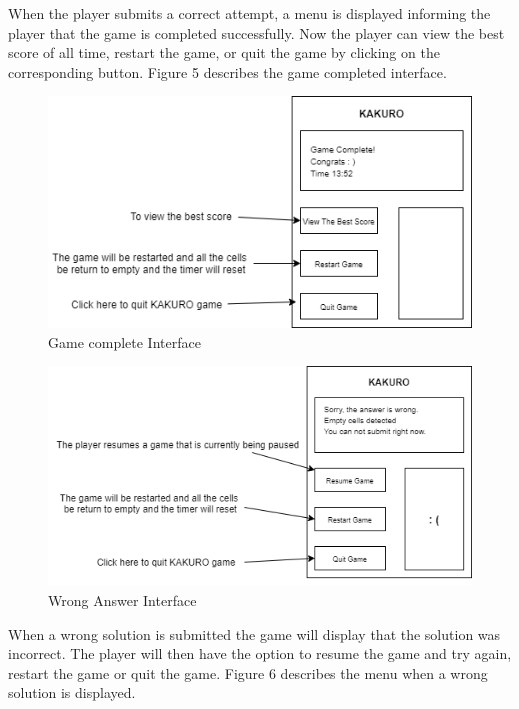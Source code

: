 \documentclass[12pt]{article}
\begin{document}
When the player submits a correct attempt, a menu is displayed informing the player that the game is completed successfully. Now the player can view the best score of all time, restart the game, or quit the game by clicking on the corresponding button. Figure 5 describes the game completed interface.   

\begin{figure}[htbp]
    \centering
    \includegraphics[scale=0.8]{UI-2.png}
    \caption{Game complete Interface}
    \label{fig:UI-2}
\end{figure}

\begin{figure}[htbp]
    \centering
    \includegraphics[scale=0.8]{UI-3.png}
    \caption{Wrong Answer Interface}
    \label{fig:UI-3}

\end{figure}

When a wrong solution is submitted the game will display that the solution was incorrect. The player will then have the option to resume the game and try again, restart the game or quit the game. Figure 6 describes the menu when a wrong solution is displayed. 
\end{document}
